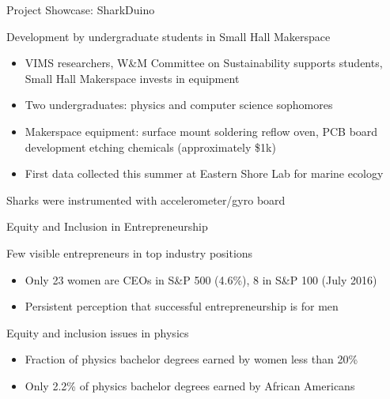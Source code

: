 \documentclass[xcolor={dvipsnames},professionalfonts]{beamer}
\begin{document}
\begin{frame}{Project Showcase: SharkDuino}
 \begin{block}{Development by undergraduate students in Small Hall Makerspace}
  \begin{itemize}
   \item VIMS researchers, W\&M Committee on Sustainability supports students, Small Hall Makerspace invests in equipment
   \item Two undergraduates: physics and computer science sophomores
   \item Makerspace equipment: surface mount soldering reflow oven, PCB board development etching chemicals (approximately \$1k)
   \item First data collected this summer at Eastern Shore Lab for marine ecology
  \end{itemize}
 \end{block}
 \begin{block}{Sharks were instrumented with accelerometer/gyro board}
 \begin{center}
   \quad {}
 \end{center}
 \end{block}
\end{frame}

\begin{frame}{Equity and Inclusion in Entrepreneurship}
 \begin{block}{Few visible entrepreneurs in top industry positions}
  \begin{itemize}
   \item Only 23 women are CEOs in S\&P 500 (4.6\%), 8 in S\&P 100 (July 2016)
   \item Persistent perception that successful entrepreneurship is for men
  \end{itemize}
 \end{block}
 \begin{block}{Equity and inclusion issues in physics\footnotemark{}}
  \begin{itemize}
   \item Fraction of physics bachelor degrees earned by women less than 20\%
   \item Only 2.2\% of physics bachelor degrees earned by African Americans
  \end{itemize}
 \end{block}
\end{frame}
\end{document}
